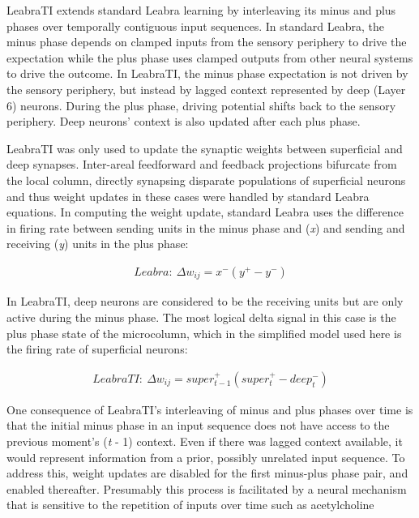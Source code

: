 \documentclass[dwyatte_dissertation.tex]{subfiles}
\begin{document}
LeabraTI extends standard Leabra learning by interleaving its minus and plus phases over temporally contiguous input sequences. In standard Leabra, the minus phase depends on clamped inputs from the sensory periphery to drive the expectation while the plus phase uses clamped outputs from other neural systems to drive the outcome. In LeabraTI, the minus phase expectation is not driven by the sensory periphery, but instead by lagged context represented by deep (Layer 6) neurons. During the plus phase, driving potential shifts back to the sensory periphery. Deep neurons' context is also updated after each plus phase.

LeabraTI was only used to update the synaptic weights between superficial and deep synapses. Inter-areal feedforward and feedback projections bifurcate from the local column, directly synapsing disparate populations of superficial neurons and thus weight updates in these cases were handled by standard Leabra equations. In computing the weight update, standard Leabra uses the difference in firing rate between sending units in the minus phase and  (\textit{x}) and sending and receiving (\textit{y}) units in the plus phase:

\begin{align*}
Leabra:~\Delta w_{ij} = x^-(y^+ - y^-)
\end{align*}

In LeabraTI, deep neurons are considered to be the receiving units but are only active during the minus phase. The most logical delta signal in this case is the plus phase state of the microcolumn, which in the simplified model used here is the firing rate of superficial neurons:

\begin{align*}
LeabraTI:~\Delta w_{ij} = super^+_{t-1}(super^+_{t} - deep^-_{t})
\end{align*}

One consequence of LeabraTI's interleaving of minus and plus phases over time is that the initial minus phase in an input sequence does not have access to the previous moment's (\textit{t} - 1) context. Even if there was lagged context available, it would represent information from a prior, possibly unrelated input sequence. To address this, weight updates are disabled for the first minus-plus phase pair, and enabled thereafter. Presumably this process is facilitated by a neural mechanism that is sensitive to the repetition of inputs over time such as acetylcholine \cite{ThielHensonMorrisEtAl01,ThielHensonDolan02}
\end{document}
